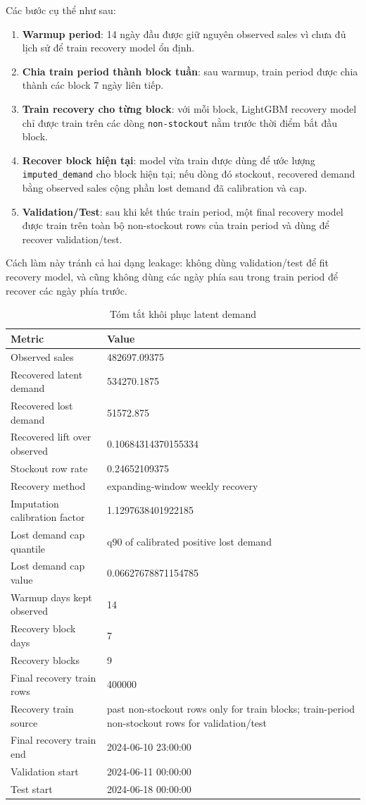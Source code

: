 \documentclass[12pt,a4paper]{article}
\begin{document}
Các bước cụ thể như sau:
\begin{enumerate}
    \item \textbf{Warmup period}: 14 ngày đầu được giữ nguyên observed sales vì chưa đủ lịch sử để train recovery model ổn định.
    \item \textbf{Chia train period thành block tuần}: sau warmup, train period được chia thành các block 7 ngày liên tiếp.
    \item \textbf{Train recovery cho từng block}: với mỗi block, LightGBM recovery model chỉ được train trên các dòng \texttt{non-stockout} nằm trước thời điểm bắt đầu block.
    \item \textbf{Recover block hiện tại}: model vừa train được dùng để ước lượng \texttt{imputed\_demand} cho block hiện tại; nếu dòng đó stockout, recovered demand bằng observed sales cộng phần lost demand đã calibration và cap.
    \item \textbf{Validation/Test}: sau khi kết thúc train period, một final recovery model được train trên toàn bộ non-stockout rows của train period và dùng để recover validation/test.
\end{enumerate}
Cách làm này tránh cả hai dạng leakage: không dùng validation/test để fit recovery model, và cũng không dùng các ngày phía sau trong train period để recover các ngày phía trước.

\begin{table}[H]
\centering
\caption{Tóm tắt khôi phục latent demand}
\begin{tabular}{ll}
\toprule
Metric & Value \\
\midrule
Observed sales & 482697.09375 \\
Recovered latent demand & 534270.1875 \\
Recovered lost demand & 51572.875 \\
Recovered lift over observed & 0.10684314370155334 \\
Stockout row rate & 0.24652109375 \\
Recovery method & expanding-window weekly recovery \\
Imputation calibration factor & 1.1297638401922185 \\
Lost demand cap quantile & q90 of calibrated positive lost demand \\
Lost demand cap value & 0.06627678871154785 \\
Warmup days kept observed & 14 \\
Recovery block days & 7 \\
Recovery blocks & 9 \\
Final recovery train rows & 400000 \\
Recovery train source & past non-stockout rows only for train blocks; train-period non-stockout rows for validation/test \\
Final recovery train end & 2024-06-10 23:00:00 \\
Validation start & 2024-06-11 00:00:00 \\
Test start & 2024-06-18 00:00:00 \\
\bottomrule
\end{tabular}
\end{table}
\end{document}

